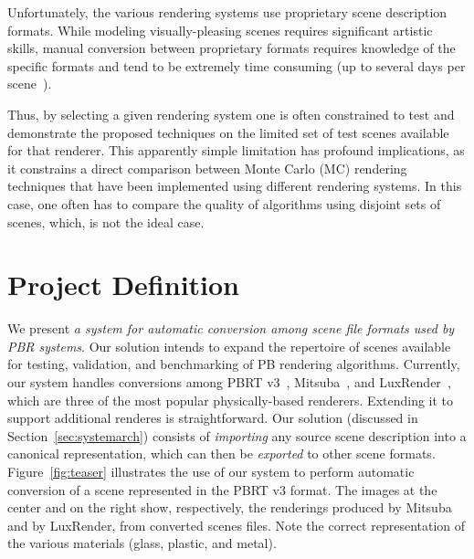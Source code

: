 Unfortunately, the various rendering systems use proprietary scene description 
formats. While modeling visually-pleasing scenes requires significant artistic 
skills, manual conversion between proprietary formats requires knowledge of the 
specific formats and tend to be extremely time consuming (up to several days per 
scene~\cite{tungsten}). 

Thus, by selecting a given rendering system one is often constrained to test and 
demonstrate the proposed techniques on the limited set of test scenes available 
for that renderer. This apparently simple limitation has profound implications, 
as it constrains a direct comparison between Monte Carlo (MC) rendering 
techniques that have been implemented using different rendering systems. In this 
case, one often has to compare the quality of algorithms using disjoint sets of 
scenes, which, is not the ideal case.  


\section{Project Definition}

We present {\it a system for automatic conversion among scene file formats used 
by PBR systems}. 
Our solution intends to expand the repertoire of scenes available for 
testing, validation, and benchmarking of PB rendering algorithms.  
Currently, our system handles conversions among PBRT v3~\cite{PBRT:v3}, 
Mitsuba~\cite{mitsuba}, and LuxRender~\cite{luxrender}, which are three of the 
most popular physically-based renderers. Extending it to support 
additional renderes is straightforward. Our solution (discussed in 
Section~\ref{sec:systemarch}) consists of {\it importing} any source scene 
description into a canonical representation, which can then be {\it exported} to 
other scene formats. 
Figure~\ref{fig:teaser} illustrates the use of our system to perform automatic 
conversion of a scene represented in the PBRT v3 format. 
The images at the center and on the right show, respectively, the renderings 
produced by Mitsuba and by LuxRender, from converted scenes files. Note the 
correct representation of the 
various materials (glass, plastic, and metal).

